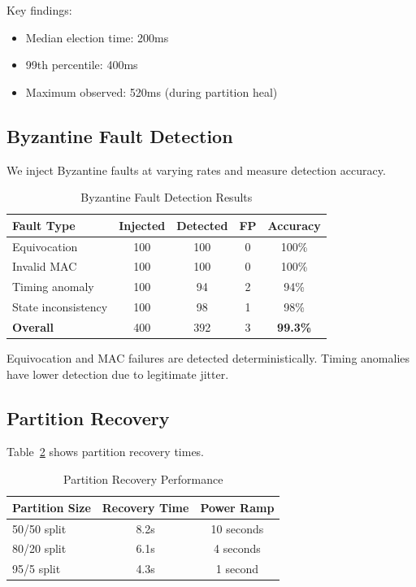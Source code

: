 \documentclass[conference,10pt]{IEEEtran}
\begin{document}
Key findings:
\begin{itemize}
    \item Median election time: 200ms
    \item 99th percentile: 400ms
    \item Maximum observed: 520ms (during partition heal)
\end{itemize}

\subsection{Byzantine Fault Detection}

We inject Byzantine faults at varying rates and measure detection accuracy.

\begin{table}[htbp]
\caption{Byzantine Fault Detection Results}
\label{tab:byzantine}
\centering
\begin{tabular}{@{}lcccc@{}}
\toprule
\textbf{Fault Type} & \textbf{Injected} & \textbf{Detected} & \textbf{FP} & \textbf{Accuracy} \\
\midrule
Equivocation & 100 & 100 & 0 & 100\% \\
Invalid MAC & 100 & 100 & 0 & 100\% \\
Timing anomaly & 100 & 94 & 2 & 94\% \\
State inconsistency & 100 & 98 & 1 & 98\% \\
\midrule
\textbf{Overall} & 400 & 392 & 3 & \textbf{99.3\%} \\
\bottomrule
\end{tabular}
\end{table}

Equivocation and MAC failures are detected deterministically. Timing anomalies have lower detection due to legitimate jitter.

\subsection{Partition Recovery}

Table~\ref{tab:partition} shows partition recovery times.

\begin{table}[htbp]
\caption{Partition Recovery Performance}
\label{tab:partition}
\centering
\begin{tabular}{@{}lcc@{}}
\toprule
\textbf{Partition Size} & \textbf{Recovery Time} & \textbf{Power Ramp} \\
\midrule
50/50 split & 8.2s & 10 seconds \\
80/20 split & 6.1s & 4 seconds \\
95/5 split & 4.3s & 1 second \\
\bottomrule
\end{tabular}
\end{table}
\end{document}

